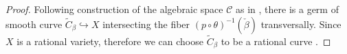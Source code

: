 \documentclass[11pt, reqno]{amsart}
\theoremstyle{plain}
\theoremstyle{definition}
\newcommand{\Spec}{{\rm Spec \,}}
\renewcommand{\tilde}{\widetilde}
\newcommand{\sC}{{\mathcal C}}
\newcommand{\sS}{{\mathcal S}}
\newcommand{\A}{{\mathbb A}}
\begin{document}
\begin{proof}


    
            
            
			Following construction of the algebraic space $\sC$ as in \cite[Theorem 9]{doub}, 
            there is a germ of smooth curve $\tilde{C}_\beta\hookrightarrow X$ intersecting the fiber $(p \circ \theta)^{-1}(\check{\beta})$
            transversally. Since $X$ is a rational variety, therefore we can choose $\tilde{C}_\beta$ to be a rational curve \cite[Proposition 3.4]{bhs1}. 

\end{proof}
\end{document}
